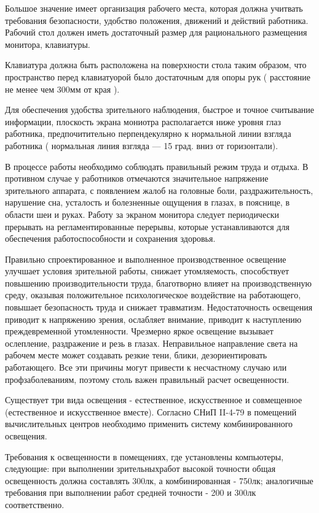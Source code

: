 \documentclass[14pt,a4paper]{reportmod}
\begin{document}
Большое значение имеет организация рабочего места, которая должна учитвать требования безопасности, удобство положения, движений и действий работника. Рабочий стол должен иметь достаточный размер для рационального размещения монитора, клавиатуры.


Клавиатура должна быть расположена на поверхности стола таким образом, что пространство перед клавиатуорой было достаточным для опоры рук ( расстояние не менее чем 300мм от края ).


Для обеспечения удобства зрительного наблюдения, быстрое и точное считывание информации, плоскость экрана мониотра располагается ниже уровня глаз работника, предпочитительно перпендекулярно к нормальной линии взгляда работника ( нормальная линия взгляда — 15 град. вниз от горизонтали).


В процессе работы необходимо соблюдать правильный режим труда и отдыха. В противном случае у работников отмечаются значительное напряжение зрительного аппарата, с появлением жалоб на головные боли, раздражительность, нарушение сна, усталость и болезненные ощущения в глазах, в пояснице, в области шеи и руках. Работу за экраном монитора следует периодически прерывать на регламентированные перерывы, которые устанавливаются для обеспечения работоспособности и сохранения здоровья.


Правильно спроектированное и выполненное производственное освещение улучшает условия зрительной работы, снижает утомляемость, способствует повышению производительности труда, благотворно влияет на производственную среду, оказывая положительное психологическое воздействие на работающего, повышает безопасность труда и снижает травматизм. Недостаточность освещения приводит к напряжению зрения, ослабляет внимание, приводит к наступлению преждевременной утомленности. Чрезмерно яркое освещение вызывает ослепление, раздражение и резь в глазах. Неправильное направление света на рабочем месте может создавать резкие тени, блики, дезориентировать работающего. Все эти причины могут привести к несчастному случаю или профзаболеваниям, поэтому столь важен правильный расчет освещенности.


Существует три вида освещения - естественное, искусственное и совмещенное (естественное и искусственное вместе). Согласно СНиП II-4-79 в помещений вычислительных центров необходимо применить систему комбинированного освещения.


Требования к освещенности в помещениях, где установлены компьютеры, следующие: при выполнении зрительныхработ высокой точности общая освещенность должна составлять 300лк, а комбинированная - 750лк; аналогичные требования при выполнении работ средней точности - 200 и 300лк соответственно.
\end{document}
